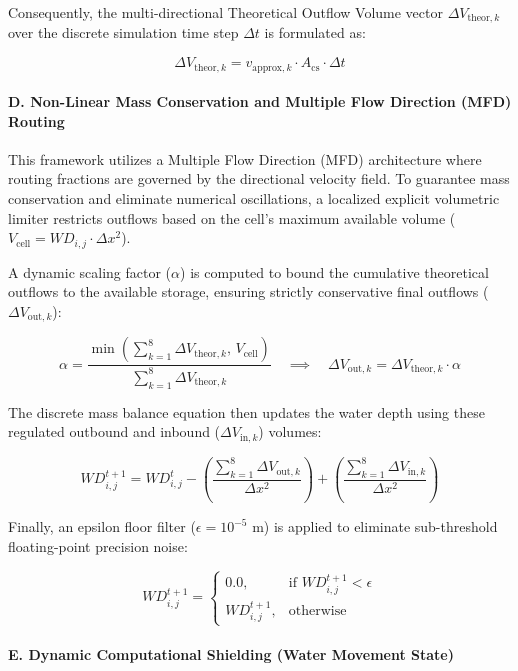 Consequently, the multi-directional Theoretical Outflow Volume vector $\Delta V_{\text{theor}, k}$ over the discrete simulation time 
step $\Delta t$ is formulated as:

$$\Delta V_{\text{theor}, k} = v_{\text{approx}, k} \cdot A_{\text{cs}} \cdot \Delta t$$

\paragraph{D. Non-Linear Mass Conservation and Multiple Flow Direction (MFD) Routing}

This framework utilizes a Multiple Flow Direction (MFD) architecture where routing fractions are governed by the directional velocity field. To guarantee mass conservation and eliminate numerical oscillations, a localized explicit volumetric limiter restricts outflows based on the cell's maximum available volume ($V_{\text{cell}} = WD_{i,j} \cdot \Delta x^2$). 

A dynamic scaling factor ($\alpha$) is computed to bound the cumulative theoretical outflows to the available storage, ensuring strictly conservative final outflows ($\Delta V_{\text{out}, k}$):

$$\alpha = \frac{\min\left(\sum_{k=1}^{8} \Delta V_{\text{theor}, k},\, V_{\text{cell}}\right)}{\sum_{k=1}^{8} \Delta V_{\text{theor}, k}} \quad \implies \quad \Delta V_{\text{out}, k} = \Delta V_{\text{theor}, k} \cdot \alpha$$

The discrete mass balance equation then updates the water depth using these regulated outbound and inbound ($\Delta V_{\text{in}, k}$) volumes:

$$WD_{i,j}^{t+1} = WD_{i,j}^{t} - \left( \frac{\sum_{k=1}^{8} \Delta V_{\text{out}, k}}{\Delta x^2} \right) + \left( \frac{\sum_{k=1}^{8} \Delta V_{\text{in}, k}}{\Delta x^2} \right)$$

Finally, an epsilon floor filter ($\epsilon = 10^{-5}\text{ m}$) is applied to eliminate sub-threshold floating-point precision noise:

$$WD_{i,j}^{t+1} = \begin{cases} 
0.0, & \text{if } WD_{i,j}^{t+1} < \epsilon \\ 
WD_{i,j}^{t+1}, & \text{otherwise} 
\end{cases}$$

\paragraph{E. Dynamic Computational Shielding (Water Movement State)}

